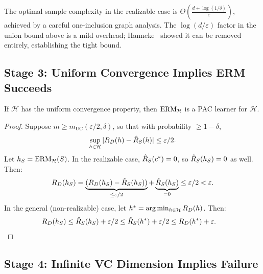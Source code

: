 \begin{remark}
\label{rmk:hanneke}
The optimal sample complexity in the realizable case is
$\Theta\!\left(\frac{d + \log(1/\delta)}{\varepsilon}\right)$, achieved by a
careful one-inclusion graph analysis.  The $\log(d/\varepsilon)$ factor in the
union bound above is a mild overhead; Hanneke~\cite{Hanneke2016} showed it can
be removed entirely, establishing the tight bound.
\end{remark}



\subsection{Stage 3: Uniform Convergence Implies ERM Succeeds}
\label{sec:erm-succeeds}

\begin{prop}
\label{prop:erm-pac}
If $\mathcal{H}$ has the uniform convergence property, then $\operatorname{ERM}_\mathcal{H}$
is a PAC learner for $\mathcal{H}$.
\end{prop}

\begin{proof}
Suppose $m \geq m_{\mathrm{UC}}(\varepsilon/2, \delta)$, so that with
probability $\geq 1 - \delta$,
\[
  \sup_{h \in \mathcal{H}} |R_D(h) - \hat{R}_S(h)| \leq \varepsilon/2.
\]
Let $h_S = \operatorname{ERM}_\mathcal{H}(S)$.  In the realizable case, $\hat{R}_S(c^*) =
0$, so $\hat{R}_S(h_S) = 0$ as well.  Then:
\[
  R_D(h_S)
  = \underbrace{(R_D(h_S) - \hat{R}_S(h_S))}_{\leq \varepsilon/2}
  + \underbrace{\hat{R}_S(h_S)}_{= 0}
  \leq \varepsilon/2 < \varepsilon.
\]
In the general (non-realizable) case, let $h^* = \arg\min_{h \in \mathcal{H}}
R_D(h)$.  Then:
\begin{align*}
R_D(h_S) &\leq \hat{R}_S(h_S) + \varepsilon/2
  \leq \hat{R}_S(h^*) + \varepsilon/2
  \leq R_D(h^*) + \varepsilon. \qedhere
\end{align*}
\end{proof}



\subsection{Stage 4: Infinite VC Dimension Implies Failure}
\label{sec:converse}

